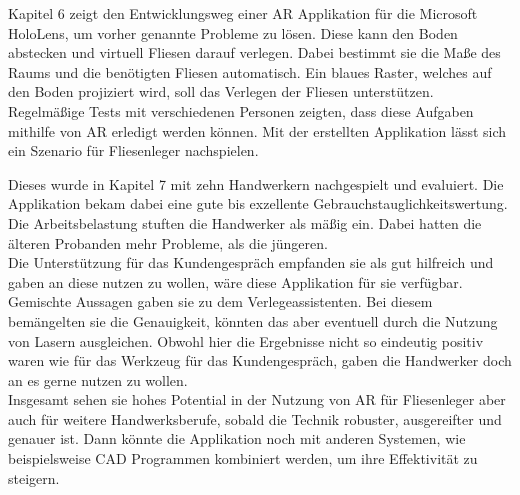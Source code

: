 Kapitel 6 zeigt den Entwicklungsweg einer AR Applikation für die Microsoft HoloLens, um vorher genannte Probleme zu lösen. Diese kann den Boden abstecken und virtuell Fliesen darauf verlegen. Dabei bestimmt sie die Maße des Raums und die benötigten Fliesen automatisch. Ein blaues Raster, welches auf den Boden projiziert wird, soll das Verlegen der Fliesen unterstützen. Regelmäßige Tests mit verschiedenen Personen zeigten, dass diese Aufgaben mithilfe von AR erledigt werden können. Mit der erstellten Applikation lässt sich ein Szenario für Fliesenleger nachspielen.

Dieses wurde in Kapitel 7 mit zehn Handwerkern nachgespielt und evaluiert. Die Applikation bekam dabei eine gute bis exzellente Gebrauchstauglichkeitswertung. Die Arbeitsbelastung stuften die Handwerker als mäßig ein. Dabei hatten die älteren Probanden mehr Probleme, als die jüngeren. \\
Die Unterstützung für das Kundengespräch empfanden sie als gut hilfreich und gaben an diese nutzen zu wollen, wäre diese Applikation für sie verfügbar. \\
Gemischte Aussagen gaben sie zu dem Verlegeassistenten. Bei diesem bemängelten sie die Genauigkeit, könnten das aber eventuell durch die Nutzung von Lasern ausgleichen. Obwohl hier die Ergebnisse nicht so eindeutig positiv waren wie für das Werkzeug für das Kundengespräch, gaben die Handwerker doch an es gerne nutzen zu wollen. \\
Insgesamt sehen sie hohes Potential in der Nutzung von AR für Fliesenleger aber auch für weitere Handwerksberufe, sobald die Technik robuster, ausgereifter und genauer ist. Dann könnte die Applikation noch mit anderen Systemen, wie beispielsweise CAD Programmen kombiniert werden, um ihre Effektivität zu steigern.

